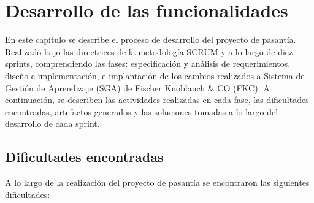 \chapter{Desarrollo de las funcionalidades}
\thispagestyle{empty} %

En este capítulo se describe el proceso de desarrollo del proyecto de pasantía. Realizado bajo las directrices de la metodología SCRUM y a lo largo de diez sprints, comprendiendo las fases: especificación y análisis de requerimientos, diseño e implementación, e implantación de los cambios realizados a Sistema de Gestión de Aprendizaje (SGA) de Fischer Knoblauch \& CO (FKC). A continuación, se describen las actividades realizadas en cada fase, las dificultades encontradas, artefactos generados y las soluciones tomadas a lo largo del desarrollo de cada sprint.













\section{Dificultades encontradas} %
\label{sec:dificultades_encontradas}

A lo largo de la realización del proyecto de pasantía se encontraron las siguientes dificultades:


